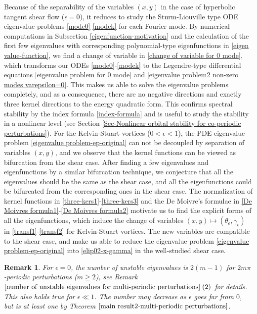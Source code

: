 \documentclass[1 [leqno, 11pt]{amsart}
\numberwithin{equation}{section}
\let\ep=\epsilon
\newtheorem{remark}[Theorem]{Remark}
\begin{document}
\begin{CJK*}{GBK}{song}
Because of the separability of the variables $(x,y)$ in the case of hyperbolic tangent shear flow ($\ep=0$), it reduces to study the Sturm-Liouville type ODE eigenvalue problems \eqref{mode0}-\eqref{modek} for each Fourier mode. By numerical computations in Subsection \ref{eigenfunction-motivation} and the calculation of the first few eigenvalues with corresponding polynomial-type eigenfunctions in \eqref{eigen value-function}, we find a change of variable in \eqref{change of variable for 0 mode}, which transforms our ODEs \eqref{mode0}-\eqref{modek}  to the Legendre-type differential  equations \eqref{eigenvalue problem for 0 mode} and \eqref{eigenvalue problem2 non-zero modes varepsilon=0}. This makes us able to solve the eigenvalue problems completely, and as a consequence, there are no negative directions and exactly three kernel directions to the energy quadratic form. This confirms spectral stability by  the index formula \eqref{index-formula} and is useful to study the  stability in a nonlinear level (see Section \ref{Sec-Nonlinear orbital stability for co-periodic perturbations}).
For the Kelvin-Stuart vortices ($0<\ep<1$), the PDE eigenvalue problem \eqref{eigenvalue problem-ep-original} can not be decoupled by separation of variables $(x,y)$, and we observe that the kernel functions can be viewed as bifurcation from the shear case. After finding a few eigenvalues and eigenfunctions by a similar bifurcation technique, we conjecture that all the eigenvalues should be the  same as the shear case, and all the eigenfunctions could be bifurcated from the corresponding ones in the shear case.  The normalization of kernel functions in \eqref{three-kers1}-\eqref{three-kers3} and the De Moivre's formulae in \eqref{De Moivres formula1}-\eqref{De Moivres formula2} motivate us to find  the explicit forms of all the  eigenfunctions, which induce the change of  variables $(x,y)\mapsto(\theta_\ep,\gamma_\ep)$ in \eqref{transf1}-\eqref{transf2} for Kelvin-Stuart vortices. The new variables are compatible to the shear case, and make us able to   reduce the eigenvalue problem \eqref{eigenvalue problem-ep-original}
 into \eqref{elip02-x-gamma} in the well-studied shear case.
\fi


\begin{remark}
 For $\ep=0$, the number of unstable eigenvalues is $2(m-1)$ for $2m\pi$-periodic perturbations ($m\geq2$), see Remark $\ref{number of unstable eigenvalues for multi-periodic perturbations} \;(2)$ for details.
This also holds true for $\ep\ll1$. The number may decrease as $\ep$ goes far from $0$, but is at least one by Theorem $\ref{main result2-multi-periodic perturbations}$.
\end{remark}
\fi



\end{CJK*}
\end{document}
